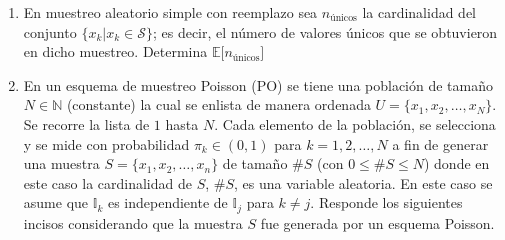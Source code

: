 \documentclass[
]{book}
\begin{document}
\begin{enumerate}
\def\labelenumi{\arabic{enumi}.}
\setcounter{enumi}{10}
\item
  En muestreo aleatorio simple con reemplazo sea \(n_{\text{únicos}}\) la cardinalidad del conjunto \(\{ x_k | x_k \in \mathcal{S}\}\); es decir, el número de valores únicos que se obtuvieron en dicho muestreo. Determina \(\mathbb{E}\big[n_{\text{únicos}}\big]\)
\item
  En un esquema de muestreo Poisson (PO) se tiene una población de tamaño \(N\in\mathbb{N}\) (constante) la cual se enlista de manera ordenada \(U = \{x_1,x_2,\dots,x_N\}\). Se recorre la lista de \(1\) hasta \(N\). Cada elemento de la población, se selecciona y se mide con probabilidad \(\pi_k \in (0,1)\) para \(k = 1,2,\dots, N\) a fin de generar una muestra \(S = \{x_1, x_2, \dots, x_n\}\) de tamaño \(\# S\) (con \(0 \leq \# S \leq N\)) donde en este caso la cardinalidad de \(S\), \(\# S\), es una variable aleatoria. En este caso se asume que \(\mathbb{I}_k\) es independiente de \(\mathbb{I}_j\) para \(k\neq j\). Responde los siguientes incisos considerando que la muestra \(S\) fue generada por un esquema Poisson.


\end{enumerate}
\end{document}

